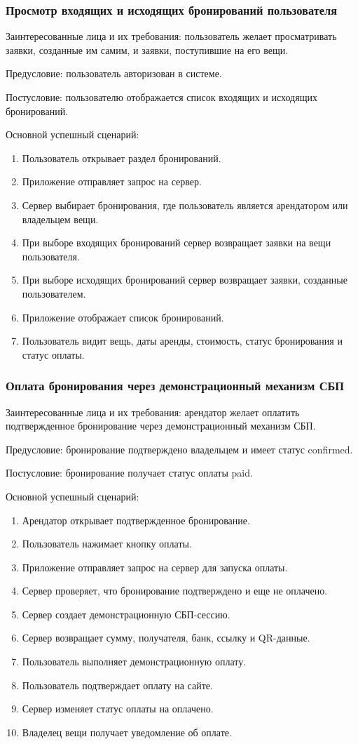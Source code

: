 \subsubsection{Просмотр входящих и исходящих бронирований пользователя}
Заинтересованные лица и их требования: пользователь желает просматривать заявки, созданные им самим, и заявки, поступившие на его вещи.

Предусловие: пользователь авторизован в системе.

Постусловие: пользователю отображается список входящих и исходящих бронирований.

Основной успешный сценарий:
\begin{enumerate}
    \item Пользователь открывает раздел бронирований.
    \item Приложение отправляет запрос на сервер.
    \item Сервер выбирает бронирования, где пользователь является арендатором или владельцем вещи.
    \item При выборе входящих бронирований сервер возвращает заявки на вещи пользователя.
    \item При выборе исходящих бронирований сервер возвращает заявки, созданные пользователем.
    \item Приложение отображает список бронирований.
    \item Пользователь видит вещь, даты аренды, стоимость, статус бронирования и статус оплаты.
\end{enumerate}
\subsubsection{Оплата бронирования через демонстрационный механизм СБП}
Заинтересованные лица и их требования: арендатор желает оплатить подтвержденное бронирование через демонстрационный механизм СБП.

Предусловие: бронирование подтверждено владельцем и имеет статус confirmed.

Постусловие: бронирование получает статус оплаты paid.

Основной успешный сценарий:
\begin{enumerate}
    \item Арендатор открывает подтвержденное бронирование.
    \item Пользователь нажимает кнопку оплаты.
    \item Приложение отправляет запрос на сервер для запуска оплаты.
    \item Сервер проверяет, что бронирование подтверждено и еще не оплачено.
    \item Сервер создает демонстрационную СБП-сессию.
    \item Сервер возвращает сумму, получателя, банк, ссылку и QR-данные.
    \item Пользователь выполняет демонстрационную оплату.
    \item Пользователь подтверждает оплату на сайте.
    \item Сервер изменяет статус оплаты на оплачено.
    \item Владелец вещи получает уведомление об оплате.
\end{enumerate}

